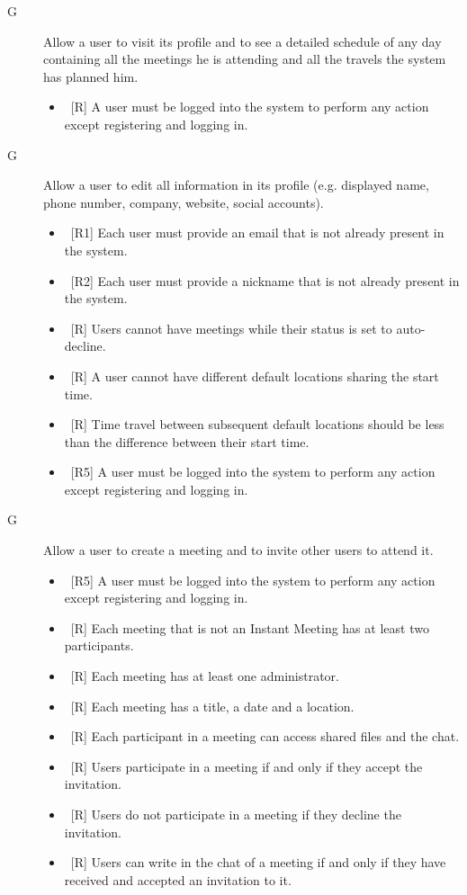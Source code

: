 \begin{description}
\item[G\thecountGoal] Allow a user to visit its profile and to see a detailed schedule of any day containing all the meetings he is attending and all the travels the system has planned him.

\begin{itemize}
\item~[R\reqNum] A user must be logged into the system to perform any action except registering and logging in.
\end{itemize}


\item[G\thecountGoal] Allow a user to edit all information in its profile (e.g. displayed name, phone number, company, website, social accounts).

\begin{itemize}
\item~[R1] Each user must provide an email that is not already present in the system.
\item~[R2] Each user must provide a nickname that is not already present in the system.
\item~[R\reqNum] Users cannot have meetings while their status is set to auto-decline.
\item~[R\reqNum] A user cannot have different default locations sharing the start time.
\item~[R\reqNum] Time travel between subsequent default locations should be less than the difference between their start time.
\item~[R5] A user must be logged into the system to perform any action except registering and logging in.
\end{itemize}

\item[G\thecountGoal] Allow a user to create a meeting and to invite other users to attend it.

\begin{itemize}
\item~[R5] A user must be logged into the system to perform any action except registering and logging in.
\item~[R\reqNum] Each meeting that is not an Instant Meeting has at least two participants.
\item~[R\reqNum] Each meeting has at least one administrator.
\item~[R\reqNum] Each meeting has a title, a date and a location.
\item~[R\reqNum] Each participant in a meeting can access shared files and the chat.
\item~[R\reqNum] Users participate in a meeting if and only if they accept the invitation.
\item~[R\reqNum] Users do not participate in a meeting if they decline the invitation.
\item~[R\reqNum] Users can write in the chat of a meeting if and only if they have received and accepted an invitation to it.
\end{itemize}


\end{description}
